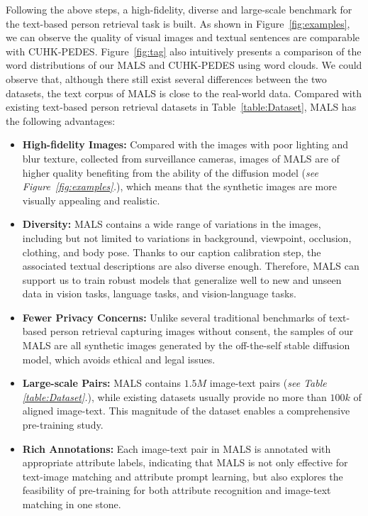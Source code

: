 \documentclass[sigconf]{acmart}
\begin{document}
Following the above steps, a high-fidelity, diverse and large-scale benchmark for the text-based person retrieval task is built. 
As shown in Figure~\ref{fig:examples}, we can observe the quality of visual images and textual sentences are comparable with CUHK-PEDES.
Figure~\ref{fig:tag} also intuitively presents a comparison of the word distributions of our MALS and CUHK-PEDES using word clouds. We could observe that, although there still exist several differences between the two datasets, the text corpus of MALS is close to the real-world data.
Compared with existing text-based person retrieval datasets in Table~\ref{table:Dataset}, MALS has the following advantages:


\begin{itemize}[leftmargin=*]
\item \textbf{High-fidelity Images:} Compared with the images with poor lighting and blur texture, collected from surveillance cameras, images of MALS are of higher quality benefiting from the ability of the diffusion model (\emph{see Figure~\ref{fig:examples}.}), which means that the synthetic images are more visually appealing and realistic.

\item \textbf{Diversity:} MALS contains a wide range of variations in the images, including but not limited to variations in background, viewpoint, occlusion, clothing, and body pose. Thanks to our caption calibration step, the associated textual descriptions are also diverse enough. Therefore, MALS can support us to train robust models that generalize well to new and unseen data in vision tasks, language tasks, and vision-language tasks.

\item \textbf{Fewer Privacy Concerns:} Unlike several traditional benchmarks of text-based person retrieval capturing images without consent, the samples of our MALS are all synthetic images generated by the off-the-self stable diffusion model, which avoids ethical and legal issues.

\item \textbf{Large-scale Pairs:} MALS contains $1.5M$ image-text pairs (\emph{see Table \ref{table:Dataset}.}), while existing datasets usually provide no more than $100k$ of aligned image-text. This magnitude of the dataset enables a comprehensive pre-training study.

\item \textbf{Rich Annotations:} Each image-text pair in MALS is annotated with appropriate attribute labels, indicating that MALS is not only effective for text-image matching and attribute prompt learning, but also explores the feasibility of pre-training for both attribute recognition and image-text matching in one stone.
\end{itemize}
\end{document}
